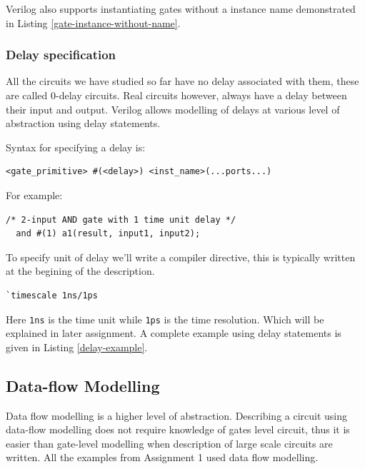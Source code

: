 \documentclass[a4paper,10pt]{article}
\theoremstyle{mytheor}
\newcommand{
  \insertverilog}[3]{
  
}
\begin{document}
\insertverilog{./verilog_files/gateLevelExample.v}{gate-level-impl}{\text{Example module using Gate-level modelling}}

Verilog also supports instantiating gates without a instance name demonstrated in Listing \ref{gate-instance-without-name}.
\insertverilog{./verilog_files/unnamedGate.v}{gate-instance-without-name}{\text{Instantiating unnamed gates}}

\subsubsection{Delay specification}
All the circuits we have studied so far have no delay associated with
them, these are called 0-delay circuits. Real circuits however, always
have a delay between their input and output. Verilog allows modelling
of delays at various level of abstraction using delay statements.

Syntax for specifying a delay is:
\begin{lstlisting}[style=verilog-inline-style, xleftmargin=0.2\textwidth]
  <gate_primitive> #(<delay>) <inst_name>(...ports...) 
\end{lstlisting}

For example:
\begin{lstlisting}[style=verilog-inline-style, xleftmargin=0.25\textwidth]
  /* 2-input AND gate with 1 time unit delay */
  and #(1) a1(result, input1, input2);
\end{lstlisting}

\vspace{0.1cm}
To specify unit of delay we'll write a compiler directive, this is typically written at the begining of the description.
\begin{center}
  \begin{lstlisting}[style=verilog-inline-style,xleftmargin=.35\textwidth]
    `timescale 1ns/1ps
  \end{lstlisting}
\end{center}


Here \lstinline[upquote=true]{1ns} is the time unit while
\lstinline[upquote=true]{1ps} is the time resolution. Which will be
explained in later assignment. A complete example using delay
statements is given in Listing \ref{delay-example}.

\insertverilog{./verilog_files/delayExample.v}{delay-example}{\text{Example usage of delays statement to specify propagation delay of logic gates.}}


\subsection{Data-flow Modelling}
Data flow modelling is a higher level of abstraction. Describing a
circuit using data-flow modelling does not require knowledge of gates
level circuit, thus it is easier than gate-level modelling when
description of large scale circuits are written.  All the examples
from Assignment 1 used data flow modelling.
\end{document}
